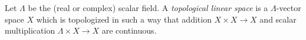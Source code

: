 Let $\Lambda$ be the (real or complex) scalar field. A \textit{topological linear space} is a $\Lambda$-vector space $X$ which is topologized in such a way that addition $X \times X \rightarrow X$ and scalar multiplication $\Lambda \times X \rightarrow X$ are continuous.
